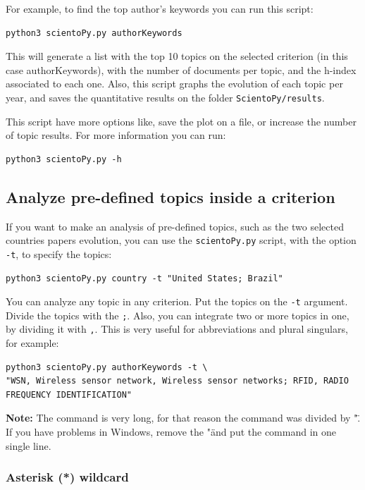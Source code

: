 \documentclass[10pt,letterpaper]{article}
\begin{document}
For example, to find the top author's keywords you can run this script: 

\begin{verbatim}
python3 scientoPy.py authorKeywords
\end{verbatim}

This will generate a list with the top 10 topics on the selected criterion (in this case authorKeywords), with the number of documents per topic, and the h-index associated to each one. Also, this script graphs the evolution of each topic per year, and saves the quantitative results on the folder \verb|ScientoPy/results|. 

This script have more options like, save the plot on a file, or increase the number of topic results. For more information you can run:

\begin{verbatim}
python3 scientoPy.py -h
\end{verbatim}

\subsection{Analyze pre-defined topics inside a criterion}

If you want to make an analysis of pre-defined topics, such as the two selected countries papers evolution, you can use the \verb|scientoPy.py| script, with the option \verb|-t|, to specify the topics: 

\begin{verbatim}
python3 scientoPy.py country -t "United States; Brazil"
\end{verbatim}

You can analyze any topic in any criterion. Put the topics on the \verb|-t| argument. Divide the topics with the \verb|;|. Also, you can integrate two or more topics in one, by dividing it with \verb|,|. This is very useful for abbreviations and plural singulars, for example: 
\begin{verbatim}
python3 scientoPy.py authorKeywords -t \
"WSN, Wireless sensor network, Wireless sensor networks; RFID, RADIO FREQUENCY IDENTIFICATION"
\end{verbatim}

\textbf{Note: } The command is very long, for that reason the command was divided by "\". If you have problems in Windows, remove the "\" and put the command in one single line.

\subsubsection{Asterisk (*) wildcard}
\end{document}
